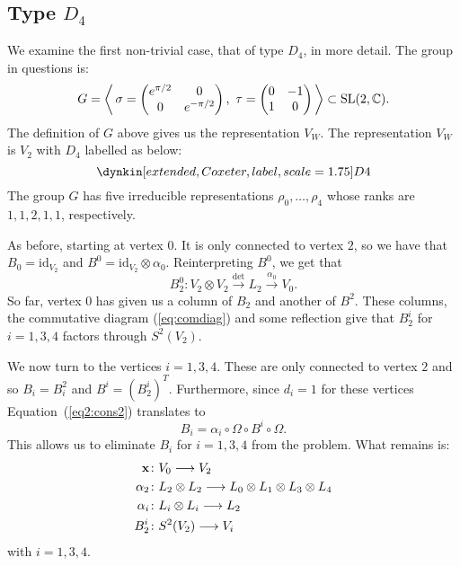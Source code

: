 \documentclass{amsart}
\theoremstyle{definition}
\newcommand\VW{V_W}
\begin{document}
\subsection{Type $D_4$}
We examine the first non-trivial case, that of type $D_4$, in more detail.
The group in questions is:
$$G= \left\langle \,\sigma=\begin{pmatrix} e^{\pi/2} & 0 \\ 0 & e^{-\pi/2} \end{pmatrix},\,\, \tau=\begin{pmatrix} 0 & -1 \\ 1 & 0 \end{pmatrix} \,\right\rangle \subset \operatorname{SL}(2, \mathbb{C}).$$
The definition of $G$ above gives us the representation $\VW$. The representation $\VW$ is $V_2$ with $D_4$ labelled as below:
\begin{equation*}
    \dynkin[extended,Coxeter,label,scale=1.75]D4{}
\end{equation*}
The group $G$ has five irreducible representations $\rho_0, \ldots, \rho_4$ whose ranks are $1,1,2,1,1$, respectively.

As before, starting at vertex $0$.
It is only connected to vertex $2$, so we have that $B_0=\text{id}_{V_2}$ and $B^0 = \text{id}_{V_2} \otimes \alpha_0$.
Reinterpreting $B^0$, we get that 
$$B_2^0 \colon V_2 \otimes V_2 \xrightarrow{\det} L_2 \xrightarrow{\alpha_0} V_0.$$
So far, vertex $0$ has given us a column of $B_2$ and another of $B^2$.
These columns, the commutative diagram (\ref{eq:comdiag}) and some reflection give that $B_2^i$ for $i=1,3,4$ factors through $S^2(V_2)$.

We now turn to the vertices $i=1,3,4$.
These are only connected to vertex $2$ and so $B_i=B_i^2$ and $B^i= (B_2^i)^T$.
Furthermore, since $d_i=1$ for these vertices Equation~(\ref{eq2:cons2}) translates to $$B_i = \alpha_i \circ \Omega \circ B^i \circ \Omega.$$
This allows us to eliminate $B_i$ for $i=1,3,4$ from the problem.
What remains is:
\begin{align*}
    \mathbf{x} \colon &V_0 \longrightarrow V_2 \\
    \alpha_2 \colon & L_2 \otimes L_2 \longrightarrow L_0 \otimes L_1 \otimes L_3 \otimes L_4 \\
    \alpha_i \colon &L_i \otimes L_i \longrightarrow L_2 \\
    B_2^i \colon &S^2(V_2) \longrightarrow V_i 
\end{align*}
with $i=1,3,4$.
\end{document}
